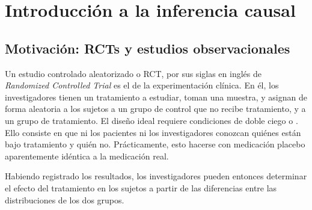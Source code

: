\chapter{Introducción a la inferencia causal}
\section{Motivación: RCTs y estudios observacionales}
Un estudio controlado aleatorizado o RCT, por sus siglas en inglés de \textit{Randomized Controlled Trial} es
el  de la experimentación clínica.
En él, los investigadores tienen un tratamiento a estudiar,
toman una muestra\footnotemark{}, y asignan de forma aleatoria\footnotemark{} a los sujetos a un grupo
de control que no recibe tratamiento, y a un grupo de tratamiento.
El diseño ideal requiere condiciones de doble ciego o .
Ello consiste en que ni los pacientes ni los investigadores conozcan
quiénes están bajo tratamiento y quién no. Prácticamente, esto hacerse
con medicación placebo aparentemente idéntica a la medicación real.


Habiendo registrado los resultados, los investigadores pueden entonces
determinar el efecto del tratamiento en los sujetos a partir de las
diferencias entre las distribuciones de los dos grupos.


